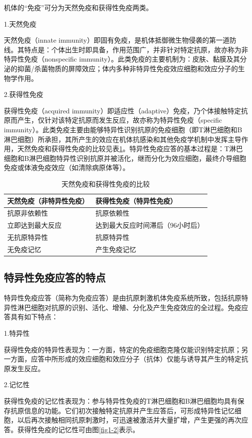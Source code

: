 机体的“免疫”可分为天然免疫和获得性免疫两类。

1.天然免疫

天然免疫（innate
immunity）即固有免疫，是机体抵御微生物侵袭的第一道防线。其特点是：个体出生时即具备，作用范围广，并非针对特定抗原，故亦称为非特异性免疫（nonspecific
immunity）。此类免疫的主要机制为：皮肤、黏膜及其分泌的抑菌/杀菌物质的屏障效应；体内多种非特异性免疫效应细胞和效应分子的生物学作用。

2.获得性免疫

获得性免疫（acquired
immunity）即适应性（adaptive）免疫，乃个体接触特定抗原而产生，仅针对该特定抗原而发生反应，故亦称为特异性免疫（specific
immunity）。此类免疫主要由能够特异性识别抗原的免疫细胞（即T淋巴细胞和B淋巴细胞）所承担，其所产生的效应在机体抗感染和其他免疫学机制中发挥主导作用，天然免疫和获得性免疫的比较见表\ref{tab1-2}。特异性免疫应答的基本过程是：T淋巴细胞和B淋巴细胞特异性识别抗原并被活化，继而分化为效应细胞，最终介导细胞免疫或体液免疫效应（如清除病原体等）。

\begin{longtable}[]{@{}ll@{}}
\caption{天然免疫和获得性免疫的比较}
\label{tab1-2}\\
\toprule
天然免疫（非特异性免疫） & 获得性免疫（特异性免疫）\tabularnewline
\midrule
\endhead
抗原非依赖性 & 抗原依赖性\tabularnewline
立即达到最大反应 & 达到最大反应时间滞后（96小时后）\tabularnewline
无抗原特异性 & 抗原特异性\tabularnewline
无免疫记忆 & 产生免疫记忆\tabularnewline
\bottomrule
\end{longtable}


\subsection{特异性免疫应答的特点}

特异性免疫应答（简称为免疫应答）是由抗原刺激机体免疫系统所致，包括抗原特异性淋巴细胞对抗原的识别、活化、增殖、分化及产生免疫效应的全过程。免疫应答具有如下特点：

1.特异性

获得性免疫的特异性表现为：一方面，特定的免疫细胞克隆仅能识别特定抗原；另一方面，应答中所形成的效应细胞和效应分子（抗体）仅能与诱导其产生的特定抗原发生反应。

2.记忆性

获得性免疫的记忆性表现为：参与特异性免疫的T淋巴细胞和B淋巴细胞均具有保存抗原信息的功能。它们初次接触特定抗原并产生应答后，可形成特异性记忆细胞，以后再次接触相同抗原刺激时，可迅速被激活并大量扩增，产生更强的再次应答。获得性免疫的记忆性可由图\ref{fig1-2}表示。

